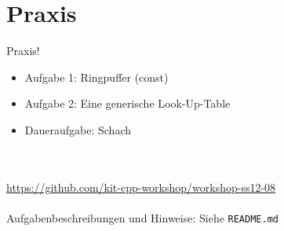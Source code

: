 \section{Praxis}
\begin{frame}[fragile]{Praxis!}
	\begin{itemize}
		\item Aufgabe 1: Ringpuffer (const)
		\item Aufgabe 2: Eine generische Look-Up-Table
		\item Daueraufgabe: Schach
	\end{itemize}
	\ \\
	\ \\
	\large{\url{https://github.com/kit-cpp-workshop/workshop-ss12-08}} \\
	\ \\
	Aufgabenbeschreibungen und Hinweise: Siehe \verb|README.md|

\end{frame}

